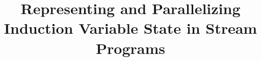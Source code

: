 \documentclass[]{acmsig-alternate-10pt}
\begin{document}


\title{Representing and Parallelizing Induction Variable State in Stream Programs}


\maketitle
\begin{abstract}

\end{abstract}














%
%
%
%
%
%
%
%




\footnotesize



\clearpage
\end{document}
